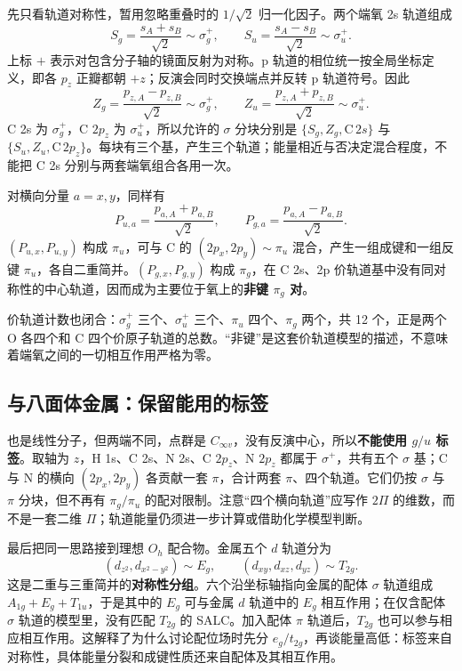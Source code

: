 \begin{worked}[端氧组合与中心碳轨道怎样配对]
先只看轨道对称性，暂用忽略重叠时的 $1/\sqrt2$ 归一化因子。两个端氧 2s 轨道组成
\[
S_g=\frac{s_A+s_B}{\sqrt2}\sim\sigma_g^+,
\qquad
S_u=\frac{s_A-s_B}{\sqrt2}\sim\sigma_u^+.
\]
上标 $+$ 表示对包含分子轴的镜面反射为对称。p 轨道的相位统一按全局坐标定义，即各 $p_z$ 正瓣都朝 $+z$；反演会同时交换端点并反转 p 轨道符号。因此
\[
Z_g=\frac{p_{z,A}-p_{z,B}}{\sqrt2}\sim\sigma_g^+,
\qquad
Z_u=\frac{p_{z,A}+p_{z,B}}{\sqrt2}\sim\sigma_u^+.
\]
C 2s 为 $\sigma_g^+$，C $2p_z$ 为 $\sigma_u^+$，所以允许的 $\sigma$ 分块分别是 $\{S_g,Z_g,\mathrm C\,2s\}$ 与 $\{S_u,Z_u,\mathrm C\,2p_z\}$。每块有三个基，产生三个轨道；能量相近与否决定混合程度，不能把 C 2s 分别与两套端氧组合各用一次。

对横向分量 $a=x,y$，同样有
\[
P_{u,a}=\frac{p_{a,A}+p_{a,B}}{\sqrt2},\qquad
P_{g,a}=\frac{p_{a,A}-p_{a,B}}{\sqrt2}.
\]
$(P_{u,x},P_{u,y})$ 构成 $\pi_u$，可与 C 的 $(2p_x,2p_y)\sim\pi_u$ 混合，产生一组成键和一组反键 $\pi_u$，各自二重简并。$(P_{g,x},P_{g,y})$ 构成 $\pi_g$，在 C 2s、2p 价轨道基中没有同对称性的中心轨道，因而成为主要位于氧上的\textbf{非键 $\pi_g$ 对}。

价轨道计数也闭合：$\sigma_g^+$ 三个、$\sigma_u^+$ 三个、$\pi_u$ 四个、$\pi_g$ 两个，共 12 个，正是两个 O 各四个和 C 四个价原子轨道的总数。“非键”是这套价轨道模型的描述，不意味着端氧之间的一切相互作用严格为零。
\end{worked}

\subsection{ 与八面体金属：保留能用的标签}

 也是线性分子，但两端不同，点群是 $C_{\infty v}$，没有反演中心，所以\textbf{不能使用 $g/u$ 标签}。取轴为 $z$，H 1s、C 2s、N 2s、C $2p_z$、N $2p_z$ 都属于 $\sigma^+$，共有五个 $\sigma$ 基；C 与 N 的横向 $(2p_x,2p_y)$ 各贡献一套 $\pi$，合计两套 $\pi$、四个轨道。它们仍按 $\sigma$ 与 $\pi$ 分块，但不再有 $\pi_g/\pi_u$ 的配对限制。注意“四个横向轨道”应写作 $2\Pi$ 的维数，而不是一套二维 $\Pi$；轨道能量仍须进一步计算或借助化学模型判断。

最后把同一思路接到理想 $O_h$ 配合物。金属五个 $d$ 轨道分为
\[
(d_{z^2},d_{x^2-y^2})\sim E_g,\qquad
(d_{xy},d_{xz},d_{yz})\sim T_{2g}.
\]
这是二重与三重简并的\textbf{对称性分组}。六个沿坐标轴指向金属的配体 $\sigma$ 轨道组成 $A_{1g}+E_g+T_{1u}$，于是其中的 $E_g$ 可与金属 $d$ 轨道中的 $E_g$ 相互作用；在仅含配体 $\sigma$ 轨道的模型里，没有匹配 $T_{2g}$ 的 SALC。加入配体 $\pi$ 轨道后，$T_{2g}$ 也可以参与相应相互作用。这解释了为什么讨论配位场时先分 $e_g/t_{2g}$，再谈能量高低：标签来自对称性，具体能量分裂和成键性质还来自配体及其相互作用。
